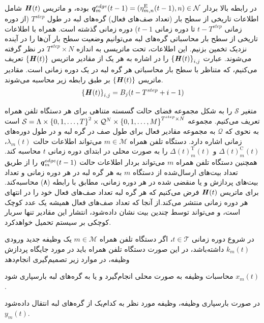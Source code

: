 در رابطه بالا بردار $\textbf{\textit{q}}_m^{edge}(t-1) = (\eta_{m,n}^{\text{E}}(t-1), n) \in \mathcal{N}$ بوده، و ماتریس $\textbf{\textit{H}}(t)$ شامل اطلاعات تاریخی از سطح بار (تعداد صف‌های فعال) گره‌های لبه در طول $T^{step}$ (از دوره زمانی $t-T^{step}$ تا دوره زمانی $t-1$) دوره زمانی گذشته است. همراه با اطلاعات تاریخی از سطح بار محاسباتی گره‌های لبه می‌توانیم وضعیت سطح بار آن‌ها را در آینده نزدیک تخمین بزنیم. این اطلاعات، تحت ماتریسی به اندازه $T^{step} \times N$ در نظر گرفته می‌شوند. عبارت $\left\{ \textbf{\textit{H}}(t) \right\}_{i,j}$ را در اشاره به هر یک از مقادیر ماتریس $\left\{ \textbf{\textit{H}}(t) \right\}$ تعریف می‌کنیم، که متناظر با سطح بار محاسباتی هر گره لبه در یک دوره زمانی است. مقادیر ماتریس $\left\{ \textbf{\textit{H}}(t) \right\}$ بر طبق رابطه زیر محاسبه می‌شوند.
\begin{alignat}{2}
	\left\{ \textbf{\textit{H}}(t) \right\}_{i,j} = B_j(t - T^{step} + i -1)
	\label{51}  
\end{alignat}


متغیر $\mathcal{S}$ را به شکل مجموعه فضای حالت گسسته متناهی برای هر دستگاه تلفن همراه تعریف می‌کنیم. مجموعه $\mathcal{S} = \Lambda \times \left\{ 0,1,\ldots,T \right\}^2 \times \mathcal{Q}^N \times \left\{ 0,1,\ldots,M \right\}^{T^{step} \times N}$ است به نحوی که $\mathcal{Q}$ به مجموعه مقادیر فعال برای طول صف در گره لبه و در طول دوره‌های زمانی اشاره دارد. 
دستگاه تلفن همراه $m \in \mathcal{M}$ می‌تواند اطلاعات حالت $\lambda_m(t)$، $\Delta(t)_m^{\text{C}}(t)$ و $\Delta(t)_m^{\text{T}}(t)$ را به صورت محلی در ابتدای دوره زمانی $t$ محاسبه کند. همچنین دستگاه تلفن همراه $m$ می‌تواند بردار اطلاعات حالت $\textbf{\textit{q}}_m^{edge}(t-1)$ را از طریق تعداد بیت‌های ارسال‌شده از دستگاه $m$ به هر گره لبه در هر دوره زمانی و تعداد بیت‌های پردازش و یا منقضی شده در هر دوره زمانی، مطابق با رابطه (۸) محاسبه‌کند. برای ماتریس $\textbf{\textit{H}}(t)$ فرض می‌کنیم که هر گره لبه تعداد صف‌های فعال خود را در انتهای هر دوره زمانی منتشر می‌کند.از آنجا که تعداد صف‌های فعال همیشه یک عدد کوچک است، و می‌تواند توسط چندین بیت نشان داده‌شود، انتشار این مقادیر تنها  سربار کوچکی بر سیستم تحمیل خواهدکرد.


در شروع دوره زمانی $t \in \mathcal{T}$، اگر دستگاه تلفن همراه $m \in \mathcal{M}$ یک وظیفه جدید ورودی $k_m(t)$ داشته‌باشد، در این صورت دستگاه تلفن همراه باید در مورد جایگاه پردازش وظیفه، در موارد زیر تصمیم‌گیری انجام‌دهد

  محاسبات وظیفه به صورت محلی انجام‌گیرد و یا به گره‌های لبه بارسپاری شود $x_m(t)$.

 در صورت بارسپاری وظیفه، وظیفه مورد نظر به کدام‌یک از گره‌های لبه انتقال داده‌شود $y_m(t)$.

